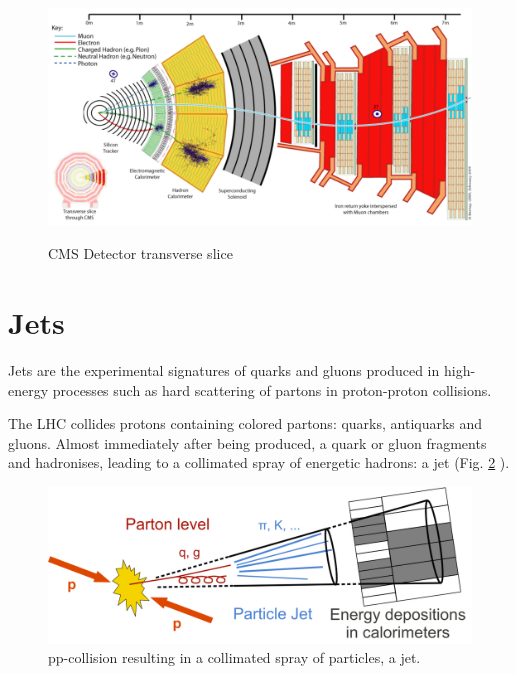 \begin{figure}[htp]
  \centering
\includegraphics[width=16cm]{CMS_chapter_plots/CMS_Slice}
\label{figure}\caption{CMS Detector transverse slice}
\end{figure}

\section{Jets }\label{aniktlab}

Jets are the experimental signatures of quarks and gluons produced in high-energy processes such as hard scattering of partons in proton-proton collisions.

The LHC collides protons containing colored partons: quarks, antiquarks and gluons. Almost immediately after being produced, a quark or gluon fragments and hadronises, leading to a collimated spray of energetic hadrons: a jet (Fig. \ref{jet1figure} ).
\begin{figure}[H]
  \centering
\includegraphics[width=12cm]{physics_objects_plots/Jet1}
\caption{pp-collision resulting in a collimated spray of particles, a jet. \label{jet1figure}}
\end{figure}

